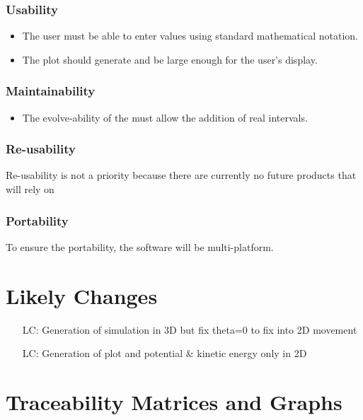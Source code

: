 \documentclass[12pt, titlepage]{article}
\newcounter{lcnum} %
\begin{document}
\subsubsection*{Usability}
\begin{itemize}
\item The user must be able to enter values using standard mathematical 
notation.
\item The plot should generate and be large enough for 
the user's display.
\end{itemize}

\subsubsection*{Maintainability}
\begin{itemize}
	\item The evolve-ability of the \progname must allow the addition 
	of real intervals.
\end{itemize}

\subsubsection*{Re-usability}
Re-usability is not a priority because there are currently no future products 
that will rely on \progname

\subsubsection*{Portability}
To ensure the portability, the \progname software will be multi-platform.

\section{Likely Changes}    

\noindent \begin{itemize}

\item[LC\refstepcounter{lcnum}\thelcnum \label{only2dsim}:] Generation of 
simulation in 3D but fix theta=0 to fix into 2D movement
\item[LC\refstepcounter{lcnum}\thelcnum \label{only2dplot}:] Generation of 
plot and potential \& kinetic energy only in 2D

\end{itemize}

\section{Traceability Matrices and Graphs}
\end{document}
